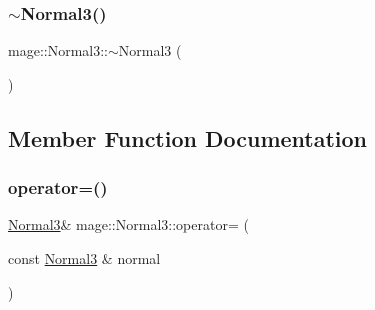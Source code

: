 \hypertarget{structmage_1_1_normal3_a3384b2970fd85fe729514ce0686b4446}{}\label{structmage_1_1_normal3_a3384b2970fd85fe729514ce0686b4446} 
\subsubsection{\texorpdfstring{$\sim$\+Normal3()}{~Normal3()}}
{\footnotesize\ttfamily mage\+::\+Normal3\+::$\sim$\+Normal3 (\begin{DoxyParamCaption}{ }\end{DoxyParamCaption})\hspace{0.3cm}{\ttfamily [default]}}



\subsection{Member Function Documentation}
\hypertarget{structmage_1_1_normal3_ade86357989ceaecf1b22bb9e53ca7fed}{}\label{structmage_1_1_normal3_ade86357989ceaecf1b22bb9e53ca7fed} 
\subsubsection{\texorpdfstring{operator=()}{operator=()}}
{\footnotesize\ttfamily \hyperlink{structmage_1_1_normal3}{Normal3}\& mage\+::\+Normal3\+::operator= (\begin{DoxyParamCaption}\item[{const \hyperlink{structmage_1_1_normal3}{Normal3} \&}]{normal }\end{DoxyParamCaption})}

